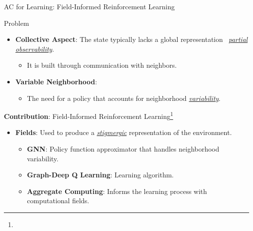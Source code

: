 \documentclass[presentation, 8pt,169]{beamer}\mode<presentation>{\usetheme{AMSBolognaFC}}
\begin{document}
\begin{frame}{AC for Learning: Field-Informed Reinforcement Learning}

  \begin{block}{Problem}
    \begin{itemize}
      \item \textbf{Collective Aspect}: The state typically lacks a global representation \faArrowRight \, \emph{\underline{partial observability}}.
        \begin{itemize}
          \item It is built through communication with neighbors.
        \end{itemize}
      \item \textbf{Variable Neighborhood}: 
        \begin{itemize}
          \item The need for a policy that accounts for neighborhood \emph{\underline{variability}}.
        \end{itemize}
    \end{itemize}
  \end{block}

  \begin{alertblock}{\textbf{Contribution}: Field-Informed Reinforcement Learning\footnote[frame]{}} 
    \begin{itemize}
      \item \textbf{Fields}: Used to produce a \emph{\underline{stigmergic}} representation of the environment.
      \begin{itemize}
        \item \textbf{GNN}: Policy function approximator that handles neighborhood variability.
        \item \textbf{Graph-Deep Q Learning}: Learning algorithm.
        \item \textbf{Aggregate Computing}: Informs the learning process with computational fields.
      \end{itemize}
    \end{itemize}
  \end{alertblock}

\end{frame}
\end{document}
